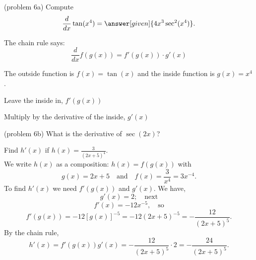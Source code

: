 \documentclass{ximera}
\begin{document}
\begin{problem}(problem 6a)
  Compute
  \[
  \frac{d}{dx} \tan(x^4) = \answer[given]{4x^3 \sec^2(x^4)}.
  \]
  
    \begin{hint}
      The chain rule says:
      \[
      \frac{d}{dx} f(g(x)) = f'(g(x))\cdot g'(x)
      \]
    \end{hint}
    \begin{hint}
      The outside function is $f(x) = \tan(x)$ and the inside
      function is $g(x) = x^4$.
    \end{hint}
    \begin{hint}
		  Leave the inside in, $f'(g(x))$
		\end{hint}
		\begin{hint}
		  Multiply by the derivative of the inside, $g'(x)$
		\end{hint}
 	
\end{problem}

\begin{question}(problem 6b)
What is the derivative of $\sec(2x)$?
\begin{multipleChoice}
\end{multipleChoice}
\end{question}



\begin{example}[example 7]
Find $h'(x)$ if $h(x) = \frac{3}{(2x + 5)^4}$.\\
We write $h(x)$ as a composition: $h(x)=f(g(x))$ with 
\[
g(x) = 2x+ 5  \quad \text{and} \quad  f(x) = \frac{3}{x^4} = 3x^{-4}.
\]
 To find $h'(x)$ we need $f'(g(x))$ and $g'(x)$.  We have,
\[g'(x) = 2; \quad \text{next}\]
\[f'(x) = -12x^{-5}, \quad \text{so}\]
\[f'(g(x)) = -12[g(x)]^{-5} = -12(2x+5)^{-5} = -\frac{12}{(2x+5)^5}.\]
By the chain rule,
\[h'(x) = f'(g(x))g'(x) = -\frac{12}{(2x+5)^5}\cdot 2 = -\frac{24}{(2x+5)^5}.\]
\end{example}

\begin{center}
\begin{foldable}
\end{foldable}
\end{center}
\end{document}
